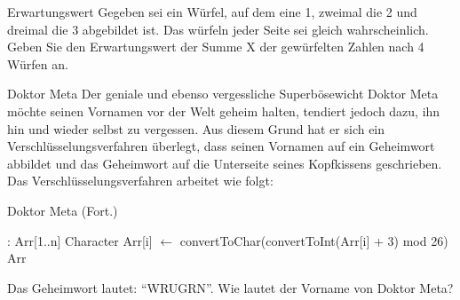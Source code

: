 \documentclass[18pt]{beamer}
\begin{document}
\begin{frame}{Erwartungswert}
Gegeben sei ein Würfel, auf dem eine 1, zweimal die 2 und dreimal die 3 
abgebildet ist. Das würfeln jeder Seite sei gleich wahrscheinlich. 
Geben Sie den Erwartungswert der Summe X der gewürfelten Zahlen 
nach 4 Würfen an.
\end{frame}

\begin{frame}{Doktor Meta}
 Der geniale und ebenso vergessliche Superbösewicht Doktor Meta 
 möchte seinen Vornamen vor der Welt geheim halten, tendiert 
 jedoch dazu, ihn hin und wieder selbst zu vergessen. Aus diesem 
 Grund hat er sich ein Verschlüsselungsverfahren überlegt, dass 
 seinen Vornamen auf ein Geheimwort abbildet und das Geheimwort 
 auf die Unterseite seines Kopfkissens geschrieben. Das 
 Verschlüsselungsverfahren arbeitet wie folgt:
 
\end{frame}

\begin{frame}[fragile]{Doktor Meta (Fort.)}
  \begin{algorithmic}
   : Arr[1..n] Character
      \State {}
      \State Arr[i] $\gets$ convertToChar(convertToInt(Arr[i] + 3) mod 26)
    \EndFor
    \State \Return Arr
  \EndFunction
 \end{algorithmic}
 
 Das Geheimwort lautet: ``WRUGRN''. Wie lautet der Vorname von Doktor Meta?
\end{frame}
\end{document}
